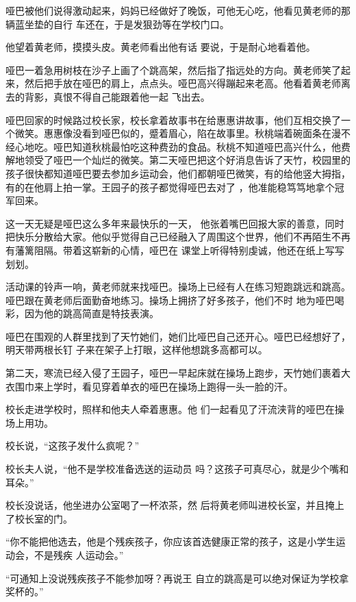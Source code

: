 \documentclass{article}
\begin{document}
哑巴被他们说得激动起来，妈妈已经做好了晚饭，可他无心吃，他看见黄老师的那辆蓝坐垫的自行
车还在，于是发狠劲等在学校门口。 

\newpage

他望着黄老师，摸摸头皮。黄老师看出他有话
要说，于是耐心地看着他。 

哑巴一着急用树枝在沙子上画了个跳高架，然后指了指远处的方向。黄老师笑了起来，然后把手放在哑巴的肩上，点点头。哑巴高兴得蹦起来老高。他看着黄老师离去的背影，真恨不得自己能跟着他一起
飞出去。 

哑巴回家的时候路过校长家，校长拿着故事书在给惠惠讲故事，他们互相交换了一个微笑。惠惠像没看到哑巴似的，蹙着眉心，陷在故事里。秋桃端着碗面条在漫不经心地吃。哑巴知道秋桃最怕吃这种费劲的食品。秋桃不知道哑巴高兴什么，他费解地领受了哑巴一个灿烂的微笑。第二天哑巴把这个好消息告诉了天竹，校园里的孩子很快都知道哑巴要去参加乡运动会，他们都朝哑巴微笑，有的给他竖大拇指，有的在他肩上拍一掌。王园子的孩子都觉得哑巴去对了
，他准能稳笃笃地拿个冠军回来。 

这一天无疑是哑巴这么多年来最快乐的一天，
\newpage
他张着嘴巴回报大家的善意，同时把快乐分散给大家。他似乎觉得自己已经融入了周围这个世界，他们不再陌生不再有藩篱阻隔。带着这崭新的心情，哑巴在
课堂上听得特别虔诚，他还在纸上写写划划。 

活动课的铃声一响，黄老师就来找哑巴。操场上已经有人在练习短跑跳远和跳高。哑巴跟在黄老师后面勤奋地练习。操场上拥挤了好多孩子，他们不时
地为哑巴喝彩，因为他的跳高简直是特技表演。 

哑巴在围观的人群里找到了天竹她们，她们比哑巴自己还开心。哑巴已经想好了，明天带两根长钉
子来在架子上打眼，这样他想跳多高都可以。 

第二天，寒流已经入侵了王园子，哑巴一早起床就在操场上跑步，天竹她们裹着大衣围巾来上学时，看见穿着单衣的哑巴在操场上跑得一头一脸的汗。

校长走进学校时，照样和他夫人牵着惠惠。他
们一起看见了汗流浃背的哑巴在操场上用功。 

\newpage


校长说，“这孩子发什么疯呢？” 

校长夫人说，“他不是学校准备选送的运动员
吗？这孩子可真尽心，就是少个嘴和耳朵。” 

校长没说话，他坐进办公室喝了一杯浓茶，然
后将黄老师叫进校长室，并且掩上了校长室的门。 

“你不能把他选去，他是个残疾孩子，你应该首选健康正常的孩子，这是小学生运动会，不是残疾
人运动会。” 

“可通知上没说残疾孩子不能参加呀？再说王
自立的跳高是可以绝对保证为学校拿奖杯的。” 
\end{document}
